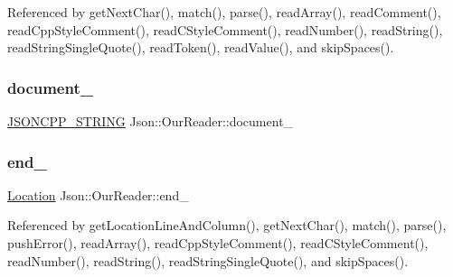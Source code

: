 Referenced by get\+Next\+Char(), match(), parse(), read\+Array(), read\+Comment(), read\+Cpp\+Style\+Comment(), read\+C\+Style\+Comment(), read\+Number(), read\+String(), read\+String\+Single\+Quote(), read\+Token(), read\+Value(), and skip\+Spaces().

\mbox{\label{classJson_1_1OurReader_a726230af83d22d25e0c76cec3408ecf1_a726230af83d22d25e0c76cec3408ecf1}} 
\subsubsection{\texorpdfstring{document\+\_\+}{document\_}}
{\footnotesize\ttfamily \hyperlink{json_8h_a1e723f95759de062585bc4a8fd3fa4be_a1e723f95759de062585bc4a8fd3fa4be}{J\+S\+O\+N\+C\+P\+P\+\_\+\+S\+T\+R\+I\+NG} Json\+::\+Our\+Reader\+::document\+\_\+\hspace{0.3cm}{\ttfamily [private]}}

\mbox{\label{classJson_1_1OurReader_ab1f69b0260c27a0d2d65dc56e42c8f9d_ab1f69b0260c27a0d2d65dc56e42c8f9d}} 
\subsubsection{\texorpdfstring{end\+\_\+}{end\_}}
{\footnotesize\ttfamily \hyperlink{classJson_1_1OurReader_a1bdc7bbc52ba87cae6b19746f2ee0189_a1bdc7bbc52ba87cae6b19746f2ee0189}{Location} Json\+::\+Our\+Reader\+::end\+\_\+\hspace{0.3cm}{\ttfamily [private]}}



Referenced by get\+Location\+Line\+And\+Column(), get\+Next\+Char(), match(), parse(), push\+Error(), read\+Array(), read\+Cpp\+Style\+Comment(), read\+C\+Style\+Comment(), read\+Number(), read\+String(), read\+String\+Single\+Quote(), and skip\+Spaces().

\mbox{\label{classJson_1_1OurReader_afb76b68ba1ab68fe09cf2838e3d4898d_afb76b68ba1ab68fe09cf2838e3d4898d}} 
